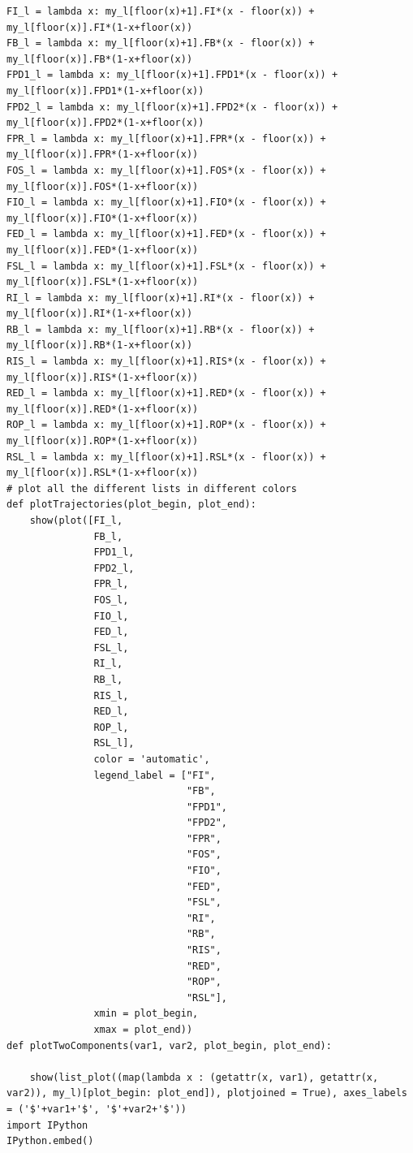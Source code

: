 \documentclass{article}
\begin{document}
\begin{lstlisting}
FI_l = lambda x: my_l[floor(x)+1].FI*(x - floor(x)) + my_l[floor(x)].FI*(1-x+floor(x))
FB_l = lambda x: my_l[floor(x)+1].FB*(x - floor(x)) + my_l[floor(x)].FB*(1-x+floor(x))
FPD1_l = lambda x: my_l[floor(x)+1].FPD1*(x - floor(x)) + my_l[floor(x)].FPD1*(1-x+floor(x))
FPD2_l = lambda x: my_l[floor(x)+1].FPD2*(x - floor(x)) + my_l[floor(x)].FPD2*(1-x+floor(x))
FPR_l = lambda x: my_l[floor(x)+1].FPR*(x - floor(x)) + my_l[floor(x)].FPR*(1-x+floor(x))
FOS_l = lambda x: my_l[floor(x)+1].FOS*(x - floor(x)) + my_l[floor(x)].FOS*(1-x+floor(x))
FIO_l = lambda x: my_l[floor(x)+1].FIO*(x - floor(x)) + my_l[floor(x)].FIO*(1-x+floor(x))
FED_l = lambda x: my_l[floor(x)+1].FED*(x - floor(x)) + my_l[floor(x)].FED*(1-x+floor(x))
FSL_l = lambda x: my_l[floor(x)+1].FSL*(x - floor(x)) + my_l[floor(x)].FSL*(1-x+floor(x))
RI_l = lambda x: my_l[floor(x)+1].RI*(x - floor(x)) + my_l[floor(x)].RI*(1-x+floor(x))
RB_l = lambda x: my_l[floor(x)+1].RB*(x - floor(x)) + my_l[floor(x)].RB*(1-x+floor(x))
RIS_l = lambda x: my_l[floor(x)+1].RIS*(x - floor(x)) + my_l[floor(x)].RIS*(1-x+floor(x))
RED_l = lambda x: my_l[floor(x)+1].RED*(x - floor(x)) + my_l[floor(x)].RED*(1-x+floor(x))
ROP_l = lambda x: my_l[floor(x)+1].ROP*(x - floor(x)) + my_l[floor(x)].ROP*(1-x+floor(x))
RSL_l = lambda x: my_l[floor(x)+1].RSL*(x - floor(x)) + my_l[floor(x)].RSL*(1-x+floor(x))
# plot all the different lists in different colors
def plotTrajectories(plot_begin, plot_end): 
	show(plot([FI_l,
			   FB_l,
			   FPD1_l,
			   FPD2_l,
			   FPR_l,
			   FOS_l,
			   FIO_l,
			   FED_l,
			   FSL_l,
			   RI_l,
			   RB_l,
			   RIS_l,
			   RED_l,
			   ROP_l,
			   RSL_l],
			   color = 'automatic',
			   legend_label = ["FI",
							   "FB",
							   "FPD1",
							   "FPD2",
							   "FPR",
							   "FOS",
							   "FIO",
							   "FED",
							   "FSL",
							   "RI",
							   "RB",
							   "RIS",
							   "RED",
							   "ROP",
							   "RSL"],
			   xmin = plot_begin,
			   xmax = plot_end))
def plotTwoComponents(var1, var2, plot_begin, plot_end):
	
	show(list_plot((map(lambda x : (getattr(x, var1), getattr(x, var2)), my_l)[plot_begin: plot_end]), plotjoined = True), axes_labels = ('$'+var1+'$', '$'+var2+'$'))
import IPython
IPython.embed()

\end{lstlisting}
\end{document}
